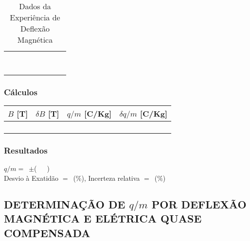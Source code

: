 \documentclass[a4paper,12pt]{article}  %
\begin{document}
\begin{table}[!hbp]
\begin{tabular}{|c|c|c|c|c|c|c|c|}
	 &  &  &  & &  & & \\ \cline{5-6}
	 &  &  &  & &  & & \\ \cline{5-6}
	 \hline
	 &  &  &  & &  & & \\ \cline{5-6}
	 &  &  &  & &  & & \\ \cline{5-6}
	 &  &  &  & &  & & \\ \cline{5-6}
	 \hline
	 &  &  &  & &  & & \\ \cline{5-6}
	 &  &  &  & &  & & \\ \cline{5-6}
	 &  &  &  & &  & & \\ \cline{5-6}
	 \hline
 	\end{tabular}	 	
	\caption{Dados da Experiência de Deflexão Magnética} 
	\label{tab:Dados}
\end{table}

\subsubsection{\sf Cálculos}

\begin{center}
	\begin{tabular}{|c|c|c|c|}
	\hline
	$B$ [T] & $\delta B$  [T] & $q/m$ [C/Kg] & $\delta q/m$ [C/Kg] \\
	\hline
	 &  &  &  \\
	\hline
	 &  &  &  \\
	\hline
	 &  &  &  \\
	\hline
	 &  &  &  \\
	 \hline
 	\end{tabular}
\end{center}


\subsubsection{\sf Resultados}
\noindent  $q/m =$~\underline{\makebox[1.5cm][r]{~}}$\pm$\underline{\makebox[1cm][r]{~}}(~~~)\\  

\noindent  Desvio à Exatidão $=$~\underline{\makebox[1cm][r]{~}}(\%), 
Incerteza relativa $=$~\underline{\makebox[1cm][r]{~}}($\%$) 

\subsection{\sf DETERMINAÇÃO DE $q/m$ POR DEFLEXÃO\\ MAGNÉTICA E ELÉTRICA QUASE COMPENSADA }
\end{document}
